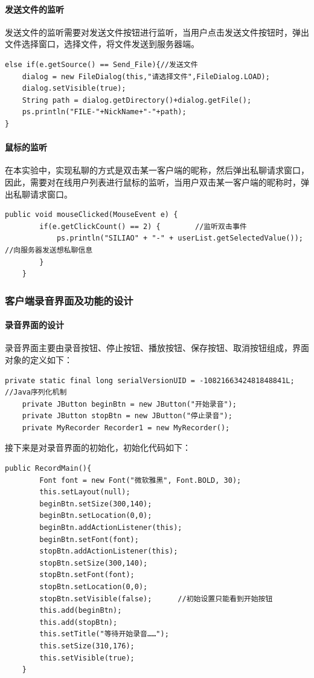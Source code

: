 \documentclass[UTF8,12pt]{article}
\begin{document}
\paragraph{发送文件的监听}
发送文件的监听需要对发送文件按钮进行监听，当用户点击发送文件按钮时，弹出文件选择窗口，选择文件，将文件发送到服务器端。

\begin{lstlisting}[title=发送文件的监听,frame=shadowbox]
    else if(e.getSource() == Send_File){//发送文件
    dialog = new FileDialog(this,"请选择文件",FileDialog.LOAD);
    dialog.setVisible(true);
    String path = dialog.getDirectory()+dialog.getFile();
    ps.println("FILE-"+NickName+"-"+path);
}
\end{lstlisting}

\paragraph{鼠标的监听}
在本实验中，实现私聊的方式是双击某一客户端的昵称，然后弹出私聊请求窗口，因此，需要对在线用户列表进行鼠标的监听，当用户双击某一客户端的昵称时，弹出私聊请求窗口。

\begin{lstlisting}[title=鼠标的监听,frame=shadowbox]
    public void mouseClicked(MouseEvent e) {
        if(e.getClickCount() == 2) {        //监听双击事件
            ps.println("SILIAO" + "-" + userList.getSelectedValue());       //向服务器发送想私聊信息
        }
    }
\end{lstlisting}

\subsubsection{客户端录音界面及功能的设计}
\paragraph{录音界面的设计}
录音界面主要由录音按钮、停止按钮、播放按钮、保存按钮、取消按钮组成，界面对象的定义如下：
\begin{lstlisting}[title=录音界面对象的定义,frame=shadowbox]
    private static final long serialVersionUID = -1082166342481848841L;    //Java序列化机制
    private JButton beginBtn = new JButton("开始录音");
    private JButton stopBtn = new JButton("停止录音");
    private MyRecorder Recorder1 = new MyRecorder();
\end{lstlisting}

接下来是对录音界面的初始化，初始化代码如下：
\begin{lstlisting}[title=录音界面的初始化,frame=shadowbox]
    public RecordMain(){
        Font font = new Font("微软雅黑", Font.BOLD, 30);
        this.setLayout(null);
        beginBtn.setSize(300,140);
        beginBtn.setLocation(0,0);
        beginBtn.addActionListener(this);
        beginBtn.setFont(font);
        stopBtn.addActionListener(this);
        stopBtn.setSize(300,140);
        stopBtn.setFont(font);
        stopBtn.setLocation(0,0);
        stopBtn.setVisible(false);      //初始设置只能看到开始按钮
        this.add(beginBtn);
        this.add(stopBtn);
        this.setTitle("等待开始录音……");
        this.setSize(310,176);
        this.setVisible(true);
    }
\end{lstlisting}
\end{document}

